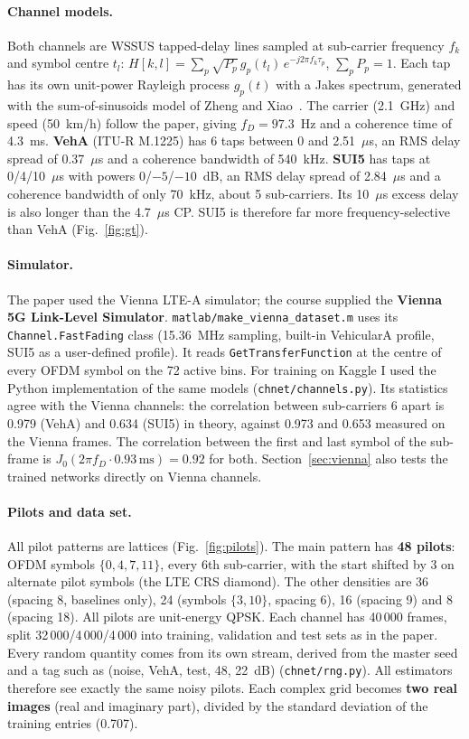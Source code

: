 \documentclass[10pt,a4paper]{article}
\newcommand{\code}[1]{\texttt{\small #1}}
\begin{document}
\paragraph{Channel models.} Both channels are WSSUS tapped-delay lines sampled at sub-carrier
frequency $f_k$ and symbol centre $t_l$:
$H[k,l]=\sum_p\sqrt{P_p}\,g_p(t_l)\,e^{-j2\pi f_k\tau_p}$, $\sum_p P_p=1$. Each tap has its own
unit-power Rayleigh process $g_p(t)$ with a Jakes spectrum, generated with the sum-of-sinusoids model
of Zheng and Xiao~\cite{zheng}. The carrier (2.1~GHz) and speed (50~km/h) follow the paper, giving
$f_D=97.3$~Hz and a coherence time of 4.3~ms. \textbf{VehA} (ITU-R M.1225) has 6 taps between 0 and
2.51~$\mu$s, an RMS delay spread of 0.37~$\mu$s and a coherence bandwidth of 540~kHz.
\textbf{SUI5} has taps at 0/4/10~$\mu$s with powers 0/$-5$/$-10$~dB, an RMS delay spread of 2.84~$\mu$s
and a coherence bandwidth of only 70~kHz, about 5 sub-carriers. Its 10~$\mu$s excess delay is also
longer than the 4.7~$\mu$s CP. SUI5 is therefore far more frequency-selective than VehA (Fig.~\ref{fig:gt}).

\paragraph{Simulator.} The paper used the Vienna LTE-A simulator; the course supplied the
\textbf{Vienna 5G Link-Level Simulator}. \code{matlab/make\_vienna\_dataset.m} uses its
\code{Channel.FastFading} class (15.36~MHz sampling, built-in VehicularA profile, SUI5 as a
user-defined profile). It reads \code{GetTransferFunction} at the centre of every OFDM symbol on the 72
active bins. For training on Kaggle I used the Python implementation of the same models
(\code{chnet/channels.py}). Its statistics agree with the Vienna channels: the correlation between
sub-carriers 6 apart is 0.979 (VehA) and 0.634 (SUI5) in theory, against 0.973 and 0.653 measured on
the Vienna frames. The correlation between the first and last symbol of the sub-frame is
$J_0(2\pi f_D\cdot0.93\,\mathrm{ms})=0.92$ for both. Section~\ref{sec:vienna} also tests the trained
networks directly on Vienna channels.

\paragraph{Pilots and data set.} All pilot patterns are lattices (Fig.~\ref{fig:pilots}). The main
pattern has \textbf{48 pilots}: OFDM symbols $\{0,4,7,11\}$, every 6th sub-carrier, with the start
shifted by 3 on alternate pilot symbols (the LTE CRS diamond). The other densities are 36 (spacing 8,
baselines only), 24 (symbols $\{3,10\}$, spacing 6), 16 (spacing 9) and 8 (spacing 18). All
pilots are unit-energy QPSK. Each channel has 40\,000 frames, split 32\,000/4\,000/4\,000 into
training, validation and test sets as in the paper. Every random quantity comes from its own stream,
derived from the master seed and a tag such as (noise, VehA, test, 48, 22~dB) (\code{chnet/rng.py}).
All estimators therefore see exactly the same noisy pilots. Each complex grid becomes \textbf{two
real images} (real and imaginary part), divided by the standard deviation of the training entries
(0.707).
\end{document}
